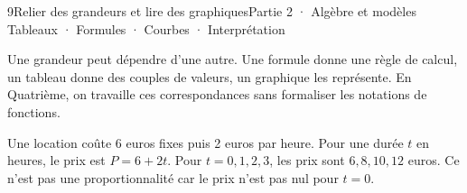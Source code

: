 \begin{ouverture}[courbe]{9}{Relier des grandeurs et lire des graphiques}{Partie 2 · Algèbre et modèles}
{Tableaux · Formules · Courbes · Interprétation}
\end{ouverture}
\pagestyle{otMain}\essentiel\fontsize{11}{15}\selectfont
{}\label{cours-9-1}
\begin{definition}Une grandeur peut dépendre d’une autre. Une formule donne une règle de calcul, un tableau donne des couples de valeurs, un graphique les représente. En Quatrième, on travaille ces correspondances sans formaliser les notations de fonctions.\end{definition}
\begin{exemple}Une location coûte 6 euros fixes puis 2 euros par heure. Pour une durée $t$ en heures, le prix est $P=6+2t$. Pour $t=0,1,2,3$, les prix sont $6,8,10,12$ euros. Ce n’est pas une proportionnalité car le prix n’est pas nul pour $t=0$.\end{exemple}
\label{fig-cours-9-1-cours-location}

